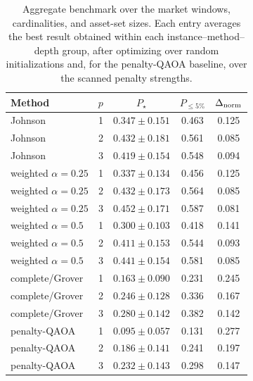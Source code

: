 \begin{table}[t]
\centering
\caption{
Aggregate benchmark over the market windows, cardinalities, and asset-set
sizes. Each entry averages the best result obtained within each
instance--method--depth group, after optimizing over random initializations
and, for the penalty-QAOA baseline, over the scanned penalty strengths.}
\label{tab:aggregate-depth}
\begin{tabular}{lcccc}
\toprule
Method & $p$ & $P_\star$ & $P_{\leq 5\%}$ & $\Delta_{\rm norm}$\\
\midrule
Johnson & 1 & $0.347\pm 0.151$ & 0.463 & 0.125\\
Johnson & 2 & $0.432\pm 0.181$ & 0.561 & 0.085\\
Johnson & 3 & $0.419\pm 0.154$ & 0.548 & 0.094\\
weighted $\alpha=0.25$ & 1 & $0.337\pm 0.134$ & 0.456 & 0.125\\
weighted $\alpha=0.25$ & 2 & $0.432\pm 0.173$ & 0.564 & 0.085\\
weighted $\alpha=0.25$ & 3 & $0.452\pm 0.171$ & 0.587 & 0.081\\
weighted $\alpha=0.5$ & 1 & $0.300\pm 0.103$ & 0.418 & 0.141\\
weighted $\alpha=0.5$ & 2 & $0.411\pm 0.153$ & 0.544 & 0.093\\
weighted $\alpha=0.5$ & 3 & $0.441\pm 0.154$ & 0.581 & 0.085\\
complete/Grover & 1 & $0.163\pm 0.090$ & 0.231 & 0.245\\
complete/Grover & 2 & $0.246\pm 0.128$ & 0.336 & 0.167\\
complete/Grover & 3 & $0.280\pm 0.142$ & 0.382 & 0.142\\
penalty-QAOA & 1 & $0.095\pm 0.057$ & 0.131 & 0.277\\
penalty-QAOA & 2 & $0.186\pm 0.141$ & 0.241 & 0.197\\
penalty-QAOA & 3 & $0.232\pm 0.143$ & 0.298 & 0.147\\
\bottomrule
\end{tabular}
\end{table}
